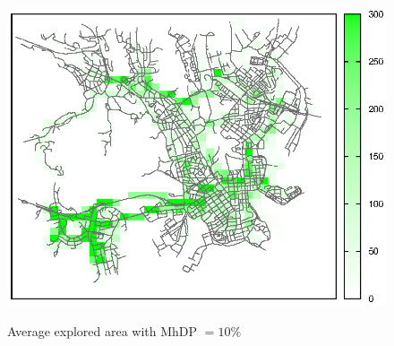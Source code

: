 \begin{figure}[htbp]
{\includegraphics[scale=0.85]{grafici/mappe/M2MShare_3_hop_10perc.eps}}
\caption{Average explored area with MhDP $= 10\%$\label{fig:mappaMultiHop_10}}
\end{figure}


